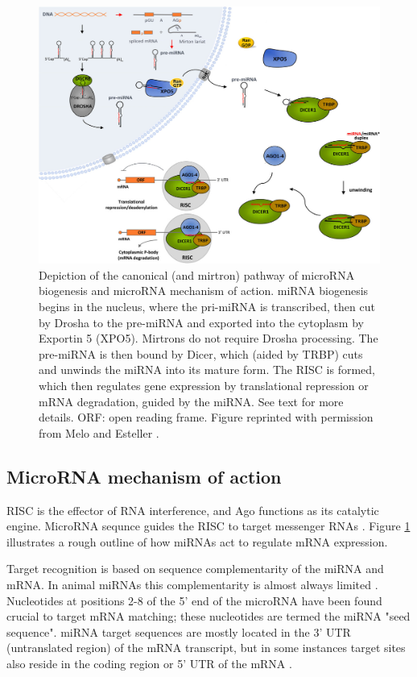 \begin{figure}[htb]
  \centering
  \includegraphics[width=1\linewidth]{figures/miRNA_biogenesis.png}
  \caption{Depiction of the canonical (and mirtron) pathway of microRNA biogenesis
  and microRNA mechanism of action. miRNA biogenesis begins in the nucleus, where
  the pri-miRNA is transcribed, then cut by Drosha to the pre-miRNA and exported
  into the cytoplasm by Exportin 5 (XPO5). Mirtrons do not require Drosha processing.
  The pre-miRNA is then bound by Dicer, which (aided by TRBP) cuts and unwinds the miRNA into
  its mature form. The RISC is formed, which then regulates gene expression by translational
  repression or mRNA degradation, guided by the miRNA. See text for more details. ORF: open reading frame.
  Figure reprinted with permission from Melo and Esteller \citep{Melo2011}.}
  \label{fig:mirna-biogenesis}
\end{figure}




\subsection{MicroRNA mechanism of action}\label{microrna-mechanism}

RISC is the effector of RNA interference, and Ago functions as its catalytic
engine. MicroRNA sequnce guides the RISC to target messenger RNAs
\citep{Filipowicz2008}. Figure \ref{fig:mirna-biogenesis} illustrates a rough
outline of how miRNAs act to regulate mRNA expression.

Target recognition is based on sequence complementarity of the miRNA and mRNA.
In animal miRNAs this complementarity is almost always limited \citep{Ambros2004}.
Nucleotides at positions 2-8 of the 5' end of the microRNA have been found
crucial to target mRNA matching; these nucleotides are termed the miRNA "seed sequence".
miRNA target sequences are mostly located in the 3' UTR (untranslated region)
of the mRNA transcript, but in some instances target sites also reside in the
coding region or 5' UTR of the mRNA \citep{Bartel2009}.

